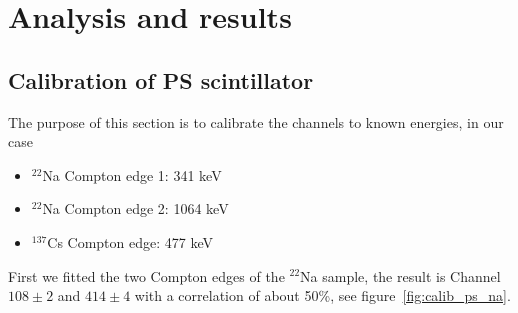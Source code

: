\section{Analysis and results}
\label{sec:analysis}


\subsection{Calibration of PS scintillator}
\label{sub:calibration}
The purpose of this section is to calibrate the channels to known energies, in our case
\begin{itemize}
\item $^{22}$Na Compton edge 1: 341 keV
\item $^{22}$Na Compton edge 2: 1064 keV
\item $^{137}$Cs Compton edge: 477 keV
\end{itemize}
First we fitted the two Compton edges of the $^{22}$Na sample, the result is
Channel $108 \pm 2$ and $414 \pm 4$ with a correlation of about 50\%, see
figure~\ref{fig:calib_ps_na}.

